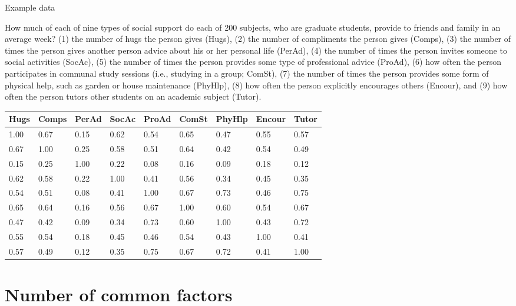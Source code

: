 \documentclass[10pt,ignorenonframetext,]{beamer}
\begin{document}
\begin{frame}{Example data}

\scriptsize
How much of each of nine types of social support do each of 200
subjects, who are graduate students, provide to friends and family in an
average week? (1) the number of hugs the person gives (Hugs), (2) the
number of compliments the person gives (Comps), (3) the number of times
the person gives another person advice about his or her personal life
(PerAd), (4) the number of times the person invites someone to social
activities (SocAc), (5) the number of times the person provides some
type of professional advice (ProAd), (6) how often the person
participates in communal study sessions (i.e., studying in a group;
ComSt), (7) the number of times the person provides some form of
physical help, such as garden or house maintenance (PhyHlp), (8) how
often the person explicitly encourages others (Encour), and (9) how
often the person tutors other students on an academic subject (Tutor).

\begin{longtable}[]{@{}lllllllll@{}}
\toprule
Hugs & Comps & PerAd & SocAc & ProAd & ComSt & PhyHlp & Encour &
Tutor\tabularnewline
\midrule
\endhead
1.00 & 0.67 & 0.15 & 0.62 & 0.54 & 0.65 & 0.47 & 0.55 &
0.57\tabularnewline
0.67 & 1.00 & 0.25 & 0.58 & 0.51 & 0.64 & 0.42 & 0.54 &
0.49\tabularnewline
0.15 & 0.25 & 1.00 & 0.22 & 0.08 & 0.16 & 0.09 & 0.18 &
0.12\tabularnewline
0.62 & 0.58 & 0.22 & 1.00 & 0.41 & 0.56 & 0.34 & 0.45 &
0.35\tabularnewline
0.54 & 0.51 & 0.08 & 0.41 & 1.00 & 0.67 & 0.73 & 0.46 &
0.75\tabularnewline
0.65 & 0.64 & 0.16 & 0.56 & 0.67 & 1.00 & 0.60 & 0.54 &
0.67\tabularnewline
0.47 & 0.42 & 0.09 & 0.34 & 0.73 & 0.60 & 1.00 & 0.43 &
0.72\tabularnewline
0.55 & 0.54 & 0.18 & 0.45 & 0.46 & 0.54 & 0.43 & 1.00 &
0.41\tabularnewline
0.57 & 0.49 & 0.12 & 0.35 & 0.75 & 0.67 & 0.72 & 0.41 &
1.00\tabularnewline
\bottomrule
\end{longtable}

\end{frame}

\section{Number of common factors}\label{number-of-common-factors}
\end{document}
